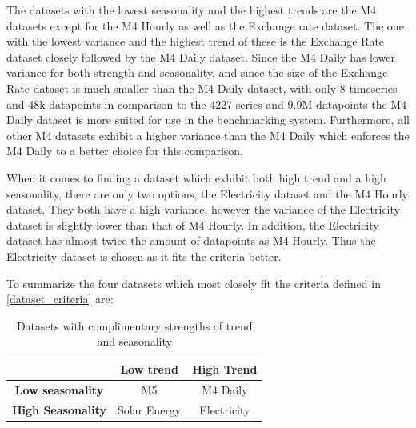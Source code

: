 The datasets with the lowest seasonality and the highest trends are the M4 datasets except for the M4 Hourly as well as the Exchange rate dataset. The one with the lowest variance and the highest trend of these is the Exchange Rate dataset closely followed by the M4 Daily dataset. Since the M4 Daily has lower variance for both strength and seasonality, and since the size of the Exchange Rate dataset is much smaller than the M4 Daily dataset, with only 8 timeseries and 48k datapoints in comparison to the 4227 series and 9.9M datapoints the M4 Daily dataset is more suited for use in the benchmarking system. Furthermore, all other M4 datasets exhibit a higher variance than the M4 Daily which enforces the M4 Daily to a better choice for this comparison.

When it comes to finding a dataset which exhibit both high trend and a high seasonality, there are only two options, the Electricity dataset and the M4 Hourly dataset. They both have a high variance, however the variance of the Electricity dataset is slightly lower than that of M4 Hourly. In addition, the Electricity dataset has almost twice the amount of datapoints as M4 Hourly. Thus the Electricity dataset is chosen as it fits the criteria better.


To summarize the four datasets which most closely fit the criteria defined in \ref{dataset_criteria} are:

\begin{table}[htp]
    \centering
    \begin{tabular}{ccc}
                                  & \textbf{Low trend} & \textbf{High Trend} \\
        \hline
        \textbf{Low seasonality}  & M5                 & M4 Daily            \\
        \hline
        \textbf{High Seasonality} & Solar Energy       & Electricity         \\
    \end{tabular}
    \caption{Datasets with complimentary strengths of trend and seasonality}
    \label{fig:representative_subset_of_datasets}
\end{table}


